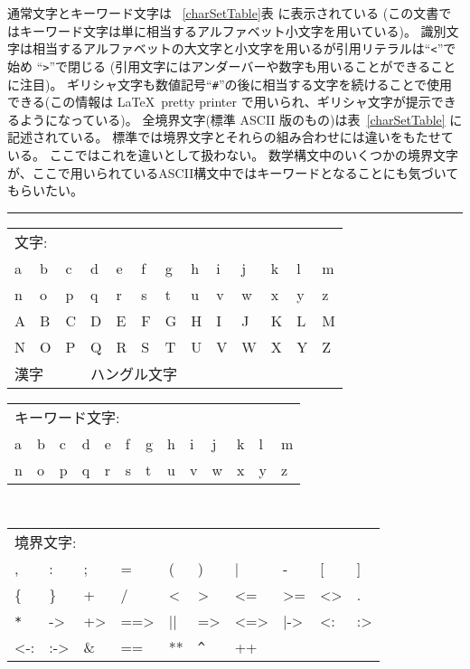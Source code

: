 \documentclass[\pformat,12pt]{jarticle}
\begin{document}
通常文字とキーワード文字は ~\ref{charSetTable}表 に表示されている (この文書ではキーワード文字は単に相当するアルファベット小文字を用いている)。 
識別文字は相当するアルファベットの大文字と小文字を用いるが引用リテラルは``{\tt <}''で始め ``{\tt >}''で閉じる (引用文字にはアンダーバーや数字も用いることができることに注目)。 
ギリシャ文字も数値記号``{\tt \#}''の後に相当する文字を続けることで使用できる(この情報は \LaTeX\ pretty printer で用いられ、ギリシャ文字が提示できるようになっている)。 
全境界文字(標準 ASCII 版のもの)は表~\ref{charSetTable} に記述されている。
標準では境界文字とそれらの組み合わせには違いをもたせている。
ここではこれを違いとして扱わない。
数学構文中のいくつかの境界文字が、ここで用いられているASCII構文中ではキーワードとなることにも気づいてもらいたい。

\begin{table}[ht]
\setlength{\tabcolsep}{3.5mm}
\setlength{\arraycolsep}{3.5mm}

\rule{\textwidth}{.5mm}
    {\sf
    \begin{tabular}{*{13}{l}} 
        \multicolumn{13}{l}{\rm 文字:} \\
        a & b & c & d & e & f & g & h & i & j & k & l & m \\
        n & o & p & q & r & s & t & u & v & w & x & y & z \\
        A & B & C & D & E & F & G & H & I & J & K & L & M \\
        N & O & P & Q & R & S & T & U & V & W & X & Y & Z \\
        \multicolumn{3}{l}{漢字} & \multicolumn{10}{l}{ハングル文字}
    \end{tabular}
    }

\blankline
    {\sf  
    \begin{tabular}{*{13}{l}}
        \multicolumn{13}{l}{\rm キーワード文字:} \\
        a & b & c & d & e & f & g & h & i & j & k & l & m \\
        n & o & p & q & r & s & t & u & v & w & x & y & z
    \end{tabular}
    }

\blankline
{\tt
    \begin{tabular}{*{10}{l}}
        \multicolumn{10}{l}{\mbox{{\rm 境界文字:}}} \\
          ,         & :         & ;         & =         & (         &
          )         & |         & -         & [         & ]         \\
          \{        & \}        & +         & /         & <         &
          >         & <=        & >=        & <>        &  .        \\
          \verb+*+  & ->        & +>        & ==>       & ||        &
          =>        &   <=>     & |->       & <:        & :>        \\
          <-:       & :->       & \&        & ==        & **        & 
          \verb+^+  & ++        &           &           &           \\
    \end{tabular}
}


\end{table}
\end{document}
